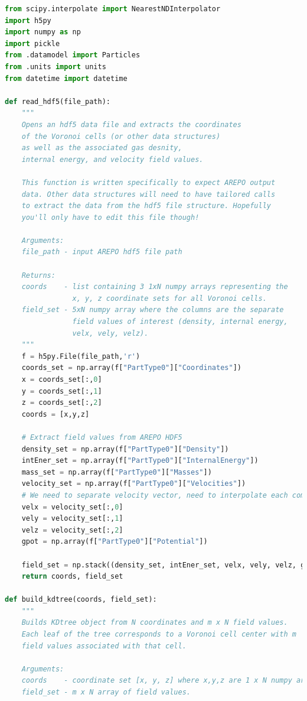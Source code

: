 \documentclass[twoside]{drexel-thesis}
\begin{document}
\begin{lstlisting}[language=python]
from scipy.interpolate import NearestNDInterpolator
import h5py
import numpy as np
import pickle
from .datamodel import Particles
from .units import units
from datetime import datetime

def read_hdf5(file_path):
    """
    Opens an hdf5 data file and extracts the coordinates
    of the Voronoi cells (or other data structures)
    as well as the associated gas desnity, 
    internal energy, and velocity field values. 
    
    This function is written specifically to expect AREPO output
    data. Other data structures will need to have tailored calls
    to extract the data from the hdf5 file structure. Hopefully
    you'll only have to edit this file though!
    
    Arguments:
    file_path - input AREPO hdf5 file path

    Returns:
    coords    - list containing 3 1xN numpy arrays representing the 
                x, y, z coordinate sets for all Voronoi cells.
    field_set - 5xN numpy array where the columns are the separate
                field values of interest (density, internal energy,
                velx, vely, velz).
    """
    f = h5py.File(file_path,'r')
    coords_set = np.array(f["PartType0"]["Coordinates"])
    x = coords_set[:,0]
    y = coords_set[:,1]
    z = coords_set[:,2]
    coords = [x,y,z]

    # Extract field values from AREPO HDF5
    density_set = np.array(f["PartType0"]["Density"])
    intEner_set = np.array(f["PartType0"]["InternalEnergy"])
    mass_set = np.array(f["PartType0"]["Masses"])
    velocity_set = np.array(f["PartType0"]["Velocities"])
    # We need to separate velocity vector, need to interpolate each component
    velx = velocity_set[:,0]
    vely = velocity_set[:,1]
    velz = velocity_set[:,2]
    gpot = np.array(f["PartType0"]["Potential"]) 

    field_set = np.stack((density_set, intEner_set, velx, vely, velz, gpot), axis=-1)
    return coords, field_set

def build_kdtree(coords, field_set):
    """
    Builds KDtree object from N coordinates and m x N field values.
    Each leaf of the tree corresponds to a Voronoi cell center with m 
    field values associated with that cell.

    Arguments:
    coords    - coordinate set [x, y, z] where x,y,z are 1 x N numpy arrays.
    field_set - m x N array of field values.


\end{lstlisting}
\end{document}
